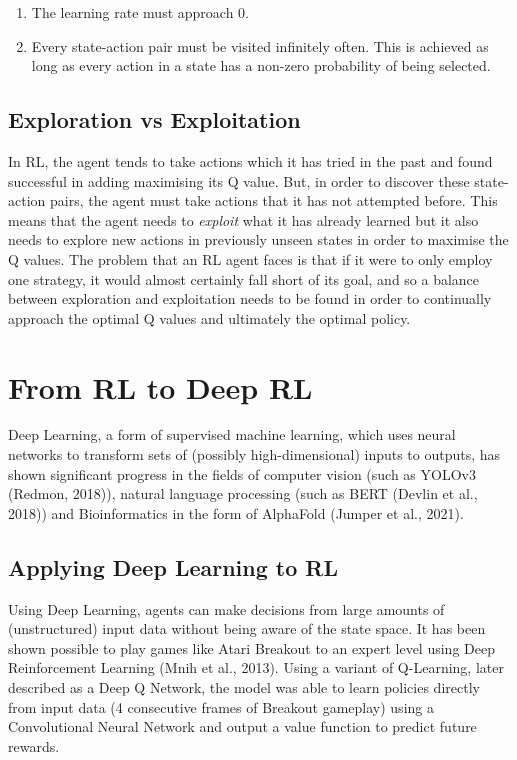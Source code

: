 \documentclass{article}
\begin{document}
\begin{enumerate}
    \item The learning rate must approach 0. 
    
    \item Every state-action pair must be visited infinitely often. This is achieved as long as every action in a state has a non-zero probability of being selected. 
\end{enumerate}


\subsection{Exploration vs Exploitation}

In RL, the agent tends to take actions which it has tried in the past and found successful in adding maximising its Q value. But, in order to discover these state-action pairs, the agent must take actions that it has not attempted before. This means that the agent needs to \textit{exploit} what it has already learned but it also needs to explore new actions in previously unseen states in order to maximise the Q values. The problem that an RL agent faces is that if it were to only employ one strategy, it would almost certainly fall short of its goal, and so a balance between exploration and exploitation needs to be found in order to continually approach the optimal Q values and ultimately the optimal policy. 



\newpage


\section{From RL to Deep RL}

Deep Learning, a form of supervised machine learning, which uses neural networks to transform sets of (possibly high-dimensional) inputs to outputs, has shown significant progress in the fields of computer vision (such as YOLOv3 (Redmon, 2018)), natural language processing (such as BERT (Devlin et al., 2018)) and Bioinformatics in the form of AlphaFold (Jumper et al., 2021). 

\subsection{Applying Deep Learning to RL}

Using Deep Learning, agents can make decisions from large amounts of (unstructured) input data without being aware of the state space. It has been shown possible to play games like Atari Breakout to an expert level using Deep Reinforcement Learning (Mnih et al., 2013). Using a variant of Q-Learning, later described as a Deep Q Network, the model was able to learn policies directly from input data (4 consecutive frames of Breakout gameplay) using a Convolutional Neural Network and output a value function to predict future rewards. 
\end{document}
